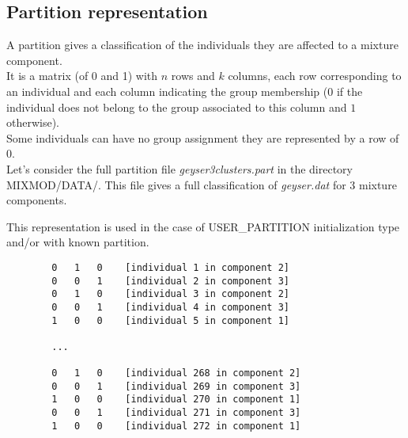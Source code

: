 \subsection{Partition representation} \label{partitionRepresentationSection}
A partition gives a classification of the individuals they are affected to a mixture component.\\
It is a matrix (of 0 and 1)
with $n$ rows and $k$ columns, each row corresponding to an individual and each column indicating the group
membership ($0$ if the individual does not belong to the group associated to this column
and $1$ otherwise).\\
Some individuals can have no group assignment they are represented by a
row of $0$.\\
Let's consider the full partition file {\it geyser3clusters.part} in the directory MIXMOD/DATA/. This file gives a
full classification of {\it geyser.dat} for 3 mixture components.

This representation is used in the case of USER\_PARTITION initialization type and/or with known partition.
{\scriptsize
\begin{verbatim}
        0   1   0    [individual 1 in component 2]
        0   0   1    [individual 2 in component 3]
        0   1   0    [individual 3 in component 2]
        0   0   1    [individual 4 in component 3]
        1   0   0    [individual 5 in component 1]

        ...

        0   1   0    [individual 268 in component 2]
        0   0   1    [individual 269 in component 3]
        1   0   0    [individual 270 in component 1]
        0   0   1    [individual 271 in component 3]
        1   0   0    [individual 272 in component 1]
\end{verbatim}}
%
%
%
%
%
%
